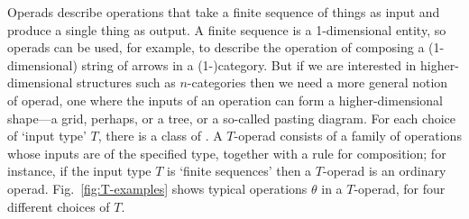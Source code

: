 Operads describe operations%
%
%
%
%
that take a finite sequence of things as input
and produce a single thing as output.  A finite sequence is a 1-dimensional
entity, so operads can be used, for example, to describe the operation of
composing a (1-dimensional) string of arrows in a (1-)category.  But if we
are interested in higher-dimensional structures such as $n$-categories
then we need a more general notion of operad, one where the inputs of an
operation can form a higher-dimensional shape---a grid, perhaps, or a tree,
or a so-called pasting diagram.  For each choice of `input type'%
%
%
$T$, there
is a class of .%
%
%
 A $T$-operad consists of a family of
operations whose inputs are of the specified type, together with a rule for
composition; for instance, if the input type $T$ is `finite sequences' then
a $T$-operad is an ordinary operad.  Fig.~\ref{fig:T-examples} shows
typical operations $\theta$ in a $T$-operad, for four different choices of
$T$.
%
